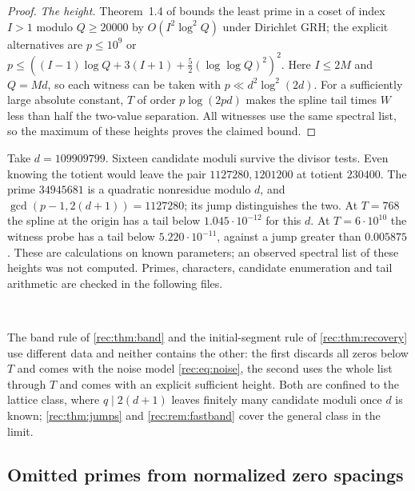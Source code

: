 \begin{proof}
\emph{The height.} Theorem~1.4 of \cite{LamzouriLiSoundararajan2015Conditional} bounds the
least prime in a coset of index $I>1$ modulo $Q\ge20000$ by $O(I^2\log^2Q)$ under Dirichlet
GRH; the explicit alternatives are $p\le10^9$ or
$p\le((I-1)\log Q+3(I+1)+\tfrac52(\log\log Q)^2)^2$. Here $I\le2M$ and $Q=Md$, so each
witness can be taken with $p\ll d^2\log^2(2d)$. For a sufficiently large absolute constant,
$T$ of order $p\log(2pd)$ makes the spline tail times $W$ less than half the two-value
separation. All witnesses use the same spectral list, so the maximum of these heights
proves the claimed bound.
\end{proof}

\begin{example}\label{rec:ex:recovery}
Take $d=109909799$. Sixteen candidate moduli survive the divisor tests. Even knowing the
totient would leave the pair $1127280,1201200$ at totient $230400$. The prime $34945681$ is
a quadratic nonresidue modulo $d$, and $\gcd(p-1,2(d+1))=1127280$; its jump distinguishes
the two. At $T=768$ the spline at the origin has a tail below $1.045\cdot10^{-12}$ for this
$d$. At $T=6\cdot10^{10}$ the witness probe has a tail below $5.220\cdot10^{-11}$, against a
jump greater than $0.005875$. These are calculations on known parameters; an observed
spectral list of these heights was not computed. Primes, characters, candidate enumeration
and tail arithmetic are checked in the following files.
\begin{center}
\\
\end{center}
\end{example}

The band rule of \cref{rec:thm:band} and the initial-segment rule of
\cref{rec:thm:recovery} use different data and neither contains the other: the first
discards all zeros below $T$ and comes with the noise model \eqref{rec:eq:noise}, the second
uses the whole list through $T$ and comes with an explicit sufficient height. Both are
confined to the lattice class, where $q\mid2(d+1)$ leaves finitely many candidate moduli
once $d$ is known; \cref{rec:thm:jumps} and \cref{rec:rem:fastband} cover the general class
in the limit.




\subsection{Omitted primes from normalized zero spacings}\label{rec:sec:gaps}

